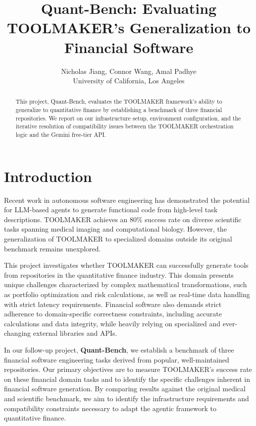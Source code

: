 \documentclass[11pt]{article}
\title{Quant-Bench: Evaluating TOOLMAKER's Generalization to Financial Software}
\author{Nicholas Jiang, Connor Wang, Amal Padhye \\
  University of California, Los Angeles}
\begin{document}
\maketitle

\begin{abstract}
This project, Quant-Bench, evaluates the TOOLMAKER framework's ability to generalize to quantitative finance by establishing a benchmark of three financial repositories. We report on our infrastructure setup, environment configuration, and the iterative resolution of compatibility issues between the TOOLMAKER orchestration logic and the Gemini free-tier API.
\end{abstract}

\section{Introduction}

Recent work in autonomous software engineering has demonstrated the potential for LLM-based agents to generate functional code from high-level task descriptions. TOOLMAKER achieves an 80\% success rate on diverse scientific tasks spanning medical imaging and computational biology. However, the generalization of TOOLMAKER to specialized domains outside its original benchmark remains unexplored.

This project investigates whether TOOLMAKER can successfully generate tools from repositories in the quantitative finance industry. This domain presents unique challenges characterized by complex mathematical transformations, such as portfolio optimization and risk calculations, as well as real-time data handling with strict latency requirements. Financial software also demands strict adherence to domain-specific correctness constraints, including accurate calculations and data integrity, while heavily relying on specialized and ever-changing external libraries and APIs.

In our follow-up project, \textbf{Quant-Bench}, we establish a benchmark of three financial software engineering tasks derived from popular, well-maintained repositories. Our primary objectives are to measure TOOLMAKER's success rate on these financial domain tasks and to identify the specific challenges inherent in financial software generation. By comparing results against the original medical and scientific benchmark, we aim to identify the infrastructure requirements and compatibility constraints necessary to adapt the agentic framework to quantitative finance. 
\end{document}
